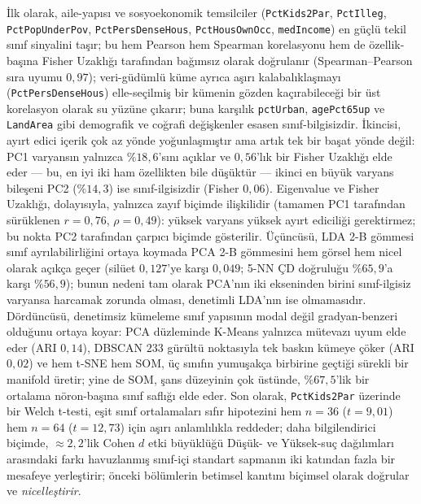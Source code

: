 \documentclass{ieeeaccess}
\begin{document}
İlk olarak, aile-yapısı ve sosyoekonomik temsilciler (\texttt{PctKids2Par}, \texttt{PctIlleg}, \texttt{PctPopUnderPov}, \texttt{PctPersDenseHous}, \texttt{PctHousOwnOcc}, \texttt{medIncome}) en güçlü tekil sınıf sinyalini taşır; bu hem Pearson hem Spearman korelasyonu hem de özellik-başına Fisher Uzaklığı tarafından bağımsız olarak doğrulanır (Spearman--Pearson sıra uyumu $0{,}97$); veri-güdümlü küme ayrıca aşırı kalabalıklaşmayı (\texttt{PctPersDenseHous}) elle-seçilmiş bir kümenin gözden kaçırabileceği bir üst korelasyon olarak su yüzüne çıkarır; buna karşılık \texttt{pctUrban}, \texttt{agePct65up} ve \texttt{LandArea} gibi demografik ve coğrafi değişkenler esasen sınıf-bilgisizdir. İkincisi, ayırt edici içerik çok az yönde yoğunlaşmıştır ama artık tek bir başat yönde değil: PC1 varyansın yalnızca $\%18{,}6$'sını açıklar ve $0{,}56$'lık bir Fisher Uzaklığı elde eder --- bu, en iyi iki ham özellikten bile düşüktür --- ikinci en büyük varyans bileşeni PC2 ($\%14{,}3$) ise sınıf-ilgisizdir (Fisher $0{,}06$). Eigenvalue ve Fisher Uzaklığı, dolayısıyla, yalnızca zayıf biçimde ilişkilidir (tamamen PC1 tarafından sürüklenen $r=0{,}76$, $\rho=0{,}49$): yüksek varyans yüksek ayırt ediciliği gerektirmez; bu nokta PC2 tarafından çarpıcı biçimde gösterilir. Üçüncüsü, LDA 2-B gömmesi sınıf ayrılabilirliğini ortaya koymada PCA 2-B gömmesini hem görsel hem nicel olarak açıkça geçer (silüet $0{,}127$'ye karşı $0{,}049$; 5-NN ÇD doğruluğu $\%65{,}9$'a karşı $\%56{,}9$); bunun nedeni tam olarak PCA'nın iki ekseninden birini sınıf-ilgisiz varyansa harcamak zorunda olması, denetimli LDA'nın ise olmamasıdır. Dördüncüsü, denetimsiz kümeleme sınıf yapısının modal değil gradyan-benzeri olduğunu ortaya koyar: PCA düzleminde K-Means yalnızca mütevazı uyum elde eder (ARI $0{,}14$), DBSCAN $233$ gürültü noktasıyla tek baskın kümeye çöker (ARI $0{,}02$) ve hem t-SNE hem SOM, üç sınıfın yumuşakça birbirine geçtiği sürekli bir manifold üretir; yine de SOM, şans düzeyinin çok üstünde, $\%67{,}5$'lik bir ortalama nöron-başına sınıf saflığı elde eder. Son olarak, \texttt{PctKids2Par} üzerinde bir Welch t-testi, eşit sınıf ortalamaları sıfır hipotezini hem $n=36$ ($t=9{,}01$) hem $n=64$ ($t=12{,}73$) için aşırı anlamlılıkla reddeder; daha bilgilendirici biçimde, $\approx 2{,}2$'lik Cohen $d$ etki büyüklüğü Düşük- ve Yüksek-suç dağılımları arasındaki farkı havuzlanmış sınıf-içi standart sapmanın iki katından fazla bir mesafeye yerleştirir; önceki bölümlerin betimsel kanıtını biçimsel olarak doğrular ve \emph{nicelleştirir}.
\end{document}
